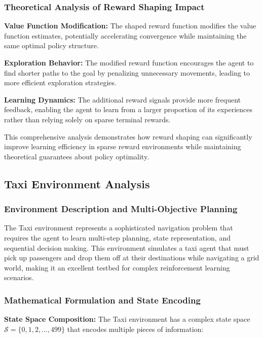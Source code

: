 \documentclass[12pt]{article}
\begin{document}
{{{\subsubsection{Theoretical Analysis of Reward Shaping Impact}

\textbf{Value Function Modification:}
The shaped reward function modifies the value function estimates, potentially accelerating convergence while maintaining the same optimal policy structure.

\textbf{Exploration Behavior:}
The modified reward function encourages the agent to find shorter paths to the goal by penalizing unnecessary movements, leading to more efficient exploration strategies.

\textbf{Learning Dynamics:}
The additional reward signals provide more frequent feedback, enabling the agent to learn from a larger proportion of its experiences rather than relying solely on sparse terminal rewards.

This comprehensive analysis demonstrates how reward shaping can significantly improve learning efficiency in sparse reward environments while maintaining theoretical guarantees about policy optimality.

\subsection{Taxi Environment Analysis}

\subsubsection{Environment Description and Multi-Objective Planning}

The Taxi environment represents a sophisticated navigation problem that requires the agent to learn multi-step planning, state representation, and sequential decision making. This environment simulates a taxi agent that must pick up passengers and drop them off at their destinations while navigating a grid world, making it an excellent testbed for complex reinforcement learning scenarios.

\subsubsection{Mathematical Formulation and State Encoding}

\textbf{State Space Composition:}
The Taxi environment has a complex state space $\mathcal{S} = \{0, 1, 2, \ldots, 499\}$ that encodes multiple pieces of information:

}}}
\end{document}
